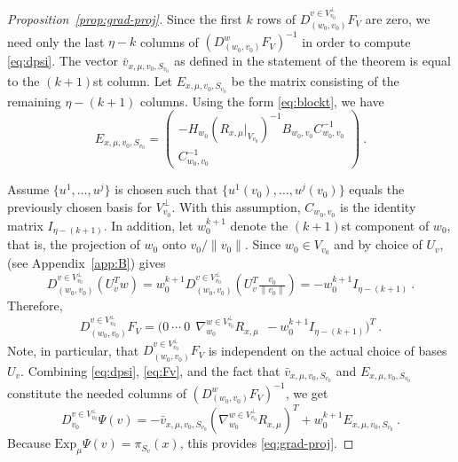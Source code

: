 \documentclass[final]{svjour3}
\newcommand{\Exp}{\mathrm{Exp}}
\newcommand{\lemref}[1]{\text{Lemma~\ref{lem:#1}}}
\newcommand{\Hess}{H}
\begin{document}
\begin{proof}[Proposition~\ref{prop:grad-proj}]
Since the first $k$ rows of $D^{v\in V_{v_0}^\perp}_{(w_0,v_0)}F_V$ are zero, we need only 
the last $\eta-k$ columns of $(D^w_{(w_0,v_0)}F_V)^{-1}$ in order to
compute \eqref{eq:dpsi}. The vector $\bar{v}_{x,\mu,v_0,S_{v_0}}$ as defined in
the statement of the theorem is equal to the $(k+1)$st column. 
Let $E_{x,\mu,v_0,S_{v_0}}$ be the matrix consisting of the remaining $\eta-(k+1)$ 
columns. Using the form \eqref{eq:blockt}, we have
\begin{equation*}
    E_{x,\mu,v_0,S_{v_0}}
    =
    \begin{pmatrix}
        -\Hess_{w_0}\left(R_{x,\mu}|_{V_{v_0}}\right)^{-1}B_{w_0,v_0} C_{w_0,v_0}^{-1} \\
        C_{w_0,v_0}^{-1}
    \end{pmatrix}
    \ .
\end{equation*}

Assume $\{u^1,\ldots,u^j\}$ is chosen such that $\{u^1(v_0),\ldots,u^j(v_0)\}$
equals the previously chosen basis for $V_{v_0}^\perp$. With this assumption,
$C_{w_0,v_0}$ is the identity matrix $I_{\eta-(k+1)}$.
In addition, let $w_0^{k+1}$ denote the $(k+1)$st component of $w_0$, 
that is, the projection of
$w_0$ onto $v_0/\|v_0\|$. Since $w_0\in V_{v_0}$ and
by choice of $U_v$, \lemref{orth-deriv} (see Appendix~\ref{app:B}) gives
\begin{equation*}
    D^{v\in V_{v_0}^\perp}_{(w_0,v_0)}\left(U_v^Tw\right)
    =
    w_0^{k+1}D^{v\in V_{v_0}^\perp}_{(w_0,v_0)}\left(U_v^T\tfrac{v_0}{\|v_0\|}\right)
    =
    -w_0^{k+1}I_{\eta-(k+1)}
    \ .
\end{equation*}
Therefore,
\begin{equation}
    D^{v\in V_{v_0}^\perp}_{(w_0,v_0)}F_V
    =
    \Big(
        0\ 
        \cdots\ 
        0\ \ 
        \nabla_{w_0}^{w\in V_{v_0}^\perp} R_{x,\mu}\ \ 
        -w_0^{k+1}I_{\eta-(k+1)}
       \Big)^T
        \ .
        \label{eq:Fv}
\end{equation}
Note, in particular, that $D^{v\in V_{v_0}^\perp}_{(w_0,v_0)}F_V$ is independent
on the actual choice of bases $U_v$. Combining \eqref{eq:dpsi}, \eqref{eq:Fv},
and the fact that
$\bar{v}_{x,\mu,v_0,S_{v_0}}$ and $E_{x,\mu,v_0,S_{v_0}}$ constitute the needed
columns of $(D^w_{(w_0,v_0)}F_V)^{-1}$, we get 
\begin{equation*}
    D^{v\in V_{v_0}^\perp}_{v_0}\Psi(v)=-\bar{v}_{x,\mu,v_0,S_{v_0}}(\nabla_{w_0}^{w\in V_{v_0}^\perp}
    R_{x,\mu})^T
    +w_0^{k+1}E_{x,\mu,v_0,S_{v_0}}
    \ .
\end{equation*}
Because $\Exp_\mu\Psi(v)=\pi_{S_v}(x)$, this provides \eqref{eq:grad-proj}.

\end{proof}
\end{document}
